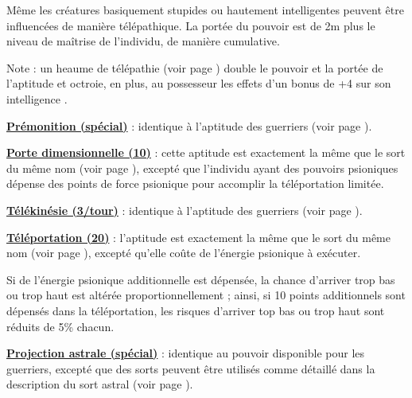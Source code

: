 \bigskip

Même les créatures basiquement stupides ou hautement intelligentes peuvent être influencées de manière télépathique. La portée du pouvoir est de 2m plus le niveau de maîtrise de l'individu, de manière cumulative.

\bigskip

Note : un heaume de télépathie (voir page \pageref{objet-heaume-telepathie}) double le pouvoir et la portée de l'aptitude et octroie, en plus, au possesseur les effets d'un bonus de +4 sur son intelligence .

\bigskip

\textbf{\uline{Prémonition (spécial)}} : identique à l'aptitude des guerriers (voir page \pageref{guerrier-premonition}).

\bigskip

\label{magicien-porte-dimensionnelle}\textbf{\uline{Porte dimensionnelle (10)}} : cette aptitude est exactement la même que le sort du même nom (voir page \pageref{sort-porte-dimensionnelle}), excepté que l'individu ayant des pouvoirs psioniques dépense des points de force psionique pour accomplir la téléportation limitée.

\bigskip

\textbf{\uline{Télékinésie (3/tour)}} : identique à l'aptitude des guerriers (voir page \pageref{guerrier-telekinesie}).

\bigskip

\label{magicien-teleportation}\textbf{\uline{Téléportation (20)}} : l'aptitude est exactement la même que le sort du même nom (voir page \pageref{sort-teleporter}), excepté qu'elle coûte de l'énergie psionique à exécuter.

\bigskip

Si de l'énergie psionique additionnelle est dépensée, la chance d'arriver trop bas ou trop haut est altérée proportionnellement ; ainsi, si 10 points additionnels sont dépensés dans la téléportation, les risques d'arriver top bas ou trop haut sont réduits de 5\% chacun.

\bigskip

\label{magicien-projection-astrale}\textbf{\uline{Projection astrale (spécial)}} : identique au pouvoir disponible pour les guerriers, excepté que des sorts peuvent être utilisés comme détaillé dans la description du sort astral (voir page \pageref{sort-astral}).

